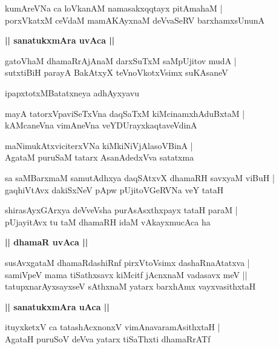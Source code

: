 \documentclass[twoside,12pt,openright]{book}
\newcounter{shloka}[chapter]
\def\uvaca#1{\centerline{{\large\textbf{#1}}}}
\begin{document}
\begin{shloka}%
kumAreVNa ca loVkanAM namasakxqqtayx pitAmahaM |\\
porxVkatxM ceVdaM mamAKAyxnaM deVvaSeRV barxhamxsUnunA 
\end{shloka}

\uvaca{|| sanatukxmAra uvAca ||}

\begin{shloka}%
gatoVhaM dhamaRrAjAnaM darxSuTxM saMpUjitov mudA |\\
sutxtiBiH parayA BakAtxyX teVnoVkotxVsimx suKAsaneV
\end{shloka}

\begin{center}
ipapxtotxMBatatxneya adhAyxyavu
\end{center}

\begin{shloka}%
mayA tatorxVpaviSeTxVna daqSaTxM kiMcinamxhAduBxtaM |\\
kAMcaneVna vimAneVna veYDUrayxkaqtaveVdinA
\end{shloka}

\begin{shloka}%
maNimukAtxviciterxVNa kiMkiNiVjAlasoVBinA |\\
AgataM puruSaM tatarx AsanAdedxVva satatxma
\end{shloka}

\begin{shloka}%
sa saMBarxmaM samutAdhxya daqSAtxvX dhamaRH savxyaM viBuH |\\
gaqhiVtAvx dakiSxNeV pApw pUjitoVGeRVNa veY tataH 
\end{shloka}

\begin{shloka}%
shirasAyxGArxya deVveVsha purAsAsxthxpayx tataH paraM |\\
pUjayitAvx tu taM dhamaRH idaM vAkayxmucAca ha 
\end{shloka}

\uvaca{|| dhamaR uvAca ||}

\begin{shloka}%
susAvxgataM dhamaRdashiRnf pirxVtoVsimx dashaRnaAtatxva |\\
samiVpeV mama tiSathxsavx kiMcitf jAcnxnaM vadasavx meV ||\\
tatupxnarAyxsayxseV sAthxnaM yatarx barxhAmx vayxvasithxtaH
\end{shloka}

\uvaca {|| sanatukxmAra uAca ||}

\begin{shloka}%
ituyxketxV ca tatashAcxnonxV vimAnavaramAsithxtaH |\\
AgataH puruSoV deVva yatarx tiSaThxti dhamaRrATf
\end{shloka}
\end{document}
